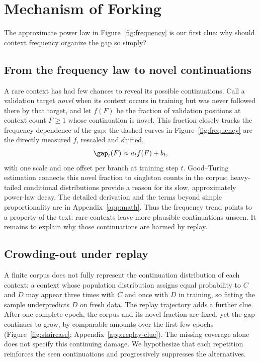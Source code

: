 \section{Mechanism of Forking}
\label{sec:mechanism}

The approximate power law in Figure~\ref{fig:frequency} is our first clue: why should context frequency organize the gap so simply?

\subsection{From the frequency law to novel continuations}
\label{sec:coverage}
A rare context has had few chances to reveal its possible continuations. Call a validation target \emph{novel} when its context occurs in training but was never followed there by that target, and let $f(F)$ be the fraction of validation positions at context count $F\ge1$ whose continuation is novel. This fraction closely tracks the frequency dependence of the gap: the dashed curves in Figure~\ref{fig:frequency} are the directly measured $f$, rescaled and shifted,
\begin{equation}
\gap_t(F)\approx a_t f(F)+b_t,
\label{eq:coverage-main}
\end{equation}
with one scale and one offset per branch at training step $t$. Good--Turing estimation connects this novel fraction to singleton counts in the corpus; heavy-tailed conditional distributions provide a reason for its slow, approximately power-law decay. The detailed derivation and the terms beyond simple proportionality are in Appendix~\ref{app:math}. Thus the frequency trend points to a property of the text: rare contexts leave more plausible continuations unseen. It remains to explain why those continuations are harmed by replay.

\subsection{Crowding-out under replay}
\label{sec:sharpening}
A finite corpus does not fully represent the continuation distribution of each context: a context whose population distribution assigns equal probability to $C$ and $D$ may appear three times with $C$ and once with $D$ in training, so fitting the sample underpredicts $D$ on fresh data. The replay trajectory adds a further clue. After one complete epoch, the corpus and its novel fraction are fixed, yet the gap continues to grow, by comparable amounts over the first few epochs (Figure~\ref{fig:staircase}; Appendix~\ref{app:replay-clue}). The missing coverage alone does not specify this continuing damage. We hypothesize that each repetition reinforces the seen continuations and progressively suppresses the alternatives.

